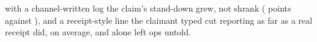 with a channel-written log the claim's stand-down grew, not shrank (\wtthHaikuHTwoDeltaROne{} points against \wtthHaikuHTwoDeltaRZero), and a receipt-style line the claimant typed cut reporting as far as a real receipt did, on average, and alone left ops untold.
